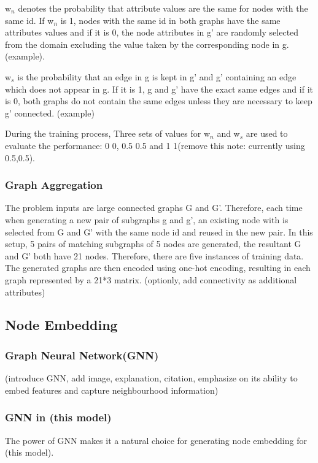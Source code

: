 w$_n$ denotes the probability that attribute values are the same for nodes with the same id. If w$_n$ is 1, nodes with the same id in both graphs have the same attributes values and if it is 0, the node attributes in g' are randomly selected from the domain excluding the value taken by the corresponding node in g.(example).

w$_s$ is the probability that an edge in g is kept in g' and g' containing an edge which does not appear in g. If it is 1, g and g' have the exact same edges and if it is 0, both graphs do not contain the same edges unless they are necessary to keep g' connected. (example)

During the training process, Three sets of values for w$_n$ and w$_s$ are used to evaluate the performance: 0 0, 0.5 0.5 and 1 1(remove this note: currently using 0.5,0.5).
\subsubsection{Graph Aggregation}
The problem inputs are large connected graphs G and G'. Therefore, each time when generating a new pair of subgraphs g and g', an existing node with is selected from G and G' with the same node id and reused in the new pair. 
\newline
\newline
In this setup, 5 pairs of matching subgraphs of 5 nodes are generated, the resultant G and G' both have 21 nodes. Therefore, there are five instances of training data. The generated graphs are then encoded using one-hot encoding, resulting in each graph represented by a 21*3 matrix. (optionly, add connectivity as additional attributes)

\subsection{Node Embedding}
\subsubsection{Graph Neural Network(GNN)}
(introduce GNN, add image, explanation, citation, emphasize on its ability to embed features and capture neighbourhood information)

\subsubsection{GNN in (this model)}
The power of GNN makes it a natural choice for generating node embedding for (this model). 

